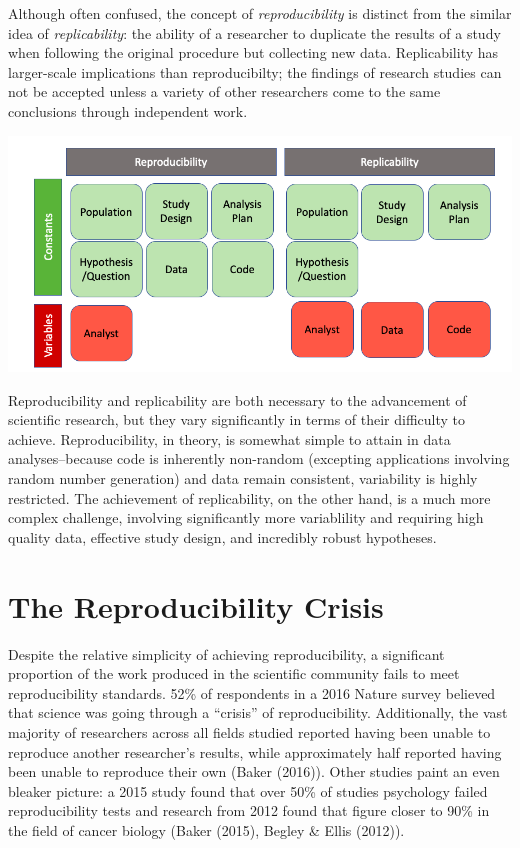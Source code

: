 \documentclass[12pt,twoside]{reedthesis}
\begin{document}
Although often confused, the concept of \emph{reproducibility} is
distinct from the similar idea of \emph{replicability}: the ability of a
researcher to duplicate the results of a study when following the
original procedure but collecting new data. Replicability has
larger-scale implications than reproducibilty; the findings of research
studies can not be accepted unless a variety of other researchers come
to the same conclusions through independent work.
\begin{center}\includegraphics[width=1\linewidth]{figure/versus} \end{center}

Reproducibility and replicability are both necessary to the advancement
of scientific research, but they vary significantly in terms of their
difficulty to achieve. Reproducibility, in theory, is somewhat simple to
attain in data analyses--because code is inherently non-random
(excepting applications involving random number generation) and data
remain consistent, variability is highly restricted. The achievement of
replicability, on the other hand, is a much more complex challenge,
involving significantly more variablility and requiring high quality
data, effective study design, and incredibly robust hypotheses.

\section{The Reproducibility Crisis}\label{the-reproducibility-crisis}

Despite the relative simplicity of achieving reproducibility, a
significant proportion of the work produced in the scientific community
fails to meet reproducibility standards. 52\% of respondents in a 2016
Nature survey believed that science was going through a ``crisis'' of
reproducibility. Additionally, the vast majority of researchers across
all fields studied reported having been unable to reproduce another
researcher's results, while approximately half reported having been
unable to reproduce their own (Baker (2016)). Other studies paint an
even bleaker picture: a 2015 study found that over 50\% of studies
psychology failed reproducibility tests and research from 2012 found
that figure closer to 90\% in the field of cancer biology (Baker (2015),
Begley \& Ellis (2012)).
\end{document}
